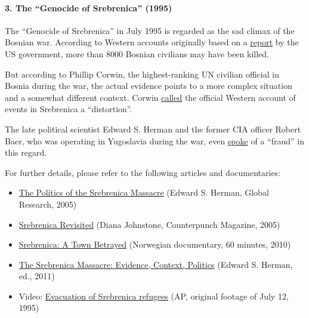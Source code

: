 \hypertarget{3-the-genocide-of-srebrenica-1995}{%
\paragraph{3. The ``Genocide of Srebrenica''
(1995)}\label{3-the-genocide-of-srebrenica-1995}}

The ``Genocide of Srebrenica'' in July 1995 is regarded as the sad
climax of the Bosnian war. According to Western accounts originally
based on a
\href{https://www.nytimes.com/1995/08/11/world/us-seeks-to-prove-mass-killings.html}{report}
by the US government, more than 8000 Bosnian civilians may have been
killed.

But according to Phillip Corwin, the highest-ranking UN civilian
official in Bosnia during the war, the actual evidence points to a more
complex situation and a somewhat different context. Corwin
\href{https://swprs.files.wordpress.com/2019/12/the-srebrenica-massacre_edward-herman_2011.pdf\#page=7}{called}
the official Western account of events in Srebrenica a ``distortion''.

The late political scientist Edward S. Herman and the former CIA officer
Robert Baer, who was operating in Yugoslavia during the war, even
\href{https://www.globalresearch.ca/the-politics-of-the-srebrenica-massacre/660}{spoke}
of a ``fraud'' in this regard.

For further details, please refer to the following articles and
documentaries:

\begin{itemize}
\tightlist
\item
  \href{https://www.globalresearch.ca/the-politics-of-the-srebrenica-massacre/660}{The
  Politics of the Srebrenica Massacre} (Edward S. Herman, Global
  Research, 2005)
\item
  \href{https://www.counterpunch.org/2005/10/12/srebrenica-revisited/}{Srebrenica
  Revisited} (Diana Johnstone, Counterpunch Magazine, 2005)
\item
  \href{https://www.youtube.com/watch?v=FvqHWS_4AuM}{Srebrenica: A Town
  Betrayed} (Norwegian documentary, 60 minutes, 2010)
\item
  \href{https://swprs.files.wordpress.com/2019/12/the-srebrenica-massacre_edward-herman_2011.pdf}{The
  Srebrenica Massacre: Evidence, Context, Politics} (Edward S. Herman,
  ed., 2011)
\item
  Video: \href{https://www.youtube.com/watch?v=KmkV7zHiHoQ}{Evacuation
  of Srebrenica refugees} (AP, original footage of July 12, 1995)
\end{itemize}

